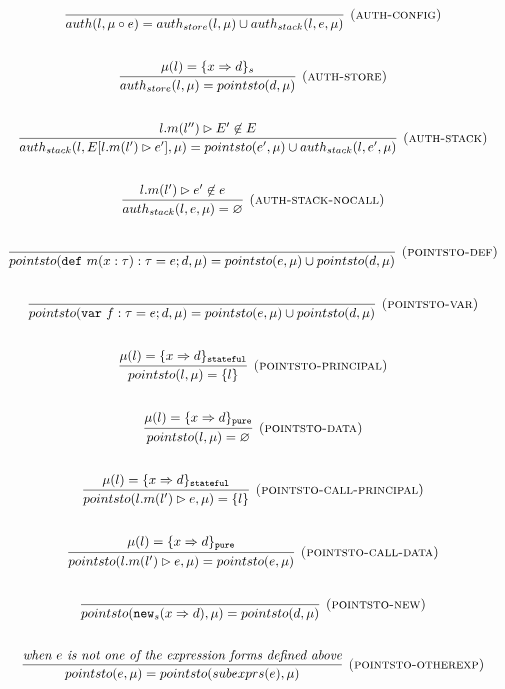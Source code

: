 \documentclass{llncs}
\newcommand{\keywadj}[1]{\mathtt{#1}}
\newcommand{\keyw}[1]{\keywadj{#1}~}
\begin{document}
\[
\begin{array}{c}
\infer[\textsc{(auth-config)}]
  {auth(l,\mu \circ e) = auth_{store}(l,\mu) \cup auth_{stack}(l,e,\mu)}
  {}\\[5ex]

\infer[\textsc{(auth-store)}]
  {auth_{store}(l,\mu) = pointsto(d,\mu)}
  {\mu(l) = \{ x \Rightarrow d \}_{s}}\\[5ex]
  
\infer[\textsc{(auth-stack)}]
  {auth_{stack}(l,E[l.m(l') \rhd e'],\mu) = pointsto(e',\mu) \cup auth_{stack}(l,e',\mu)}
  {l.m(l'') \rhd E' \not\in E}\\[5ex]
  
\infer[\textsc{(auth-stack-nocall)}]
  {auth_{stack}(l,e,\mu) = \varnothing}
  {l.m(l') \rhd e' \not\in e}\\[5ex]
  
\infer[\textsc{(pointsto-def)}]
  {pointsto(\keyw{def} m(x:\tau):\tau = e; d,\mu) = pointsto(e,\mu) \cup pointsto(d,\mu)}
  {}\\[5ex]
  
\infer[\textsc{(pointsto-var)}]
  {pointsto(\keyw{var} f:\tau = e; d,\mu) = pointsto(e,\mu) \cup pointsto(d,\mu)}
  {}\\[5ex]
  
\infer[\textsc{(pointsto-principal)}]
  {pointsto(l,\mu) = \{ l \}}
  {\mu(l) = \{ x \Rightarrow d \}_\keywadj{stateful}}\\[5ex]
  
\infer[\textsc{(pointsto-data)}]
  {pointsto(l,\mu) = \varnothing }
  {\mu(l) = \{ x \Rightarrow d \}_\keywadj{pure}}\\[5ex]

\infer[\textsc{(pointsto-call-principal)}]
  {pointsto(l.m(l') \rhd e,\mu) = \{l\} }
  {\mu(l) = \{ x \Rightarrow d \}_\keywadj{stateful}}\\[5ex]
  
\infer[\textsc{(pointsto-call-data)}]
  {pointsto(l.m(l') \rhd e,\mu) = pointsto(e,\mu)}
  {\mu(l) = \{ x \Rightarrow d \}_\keywadj{pure}}\\[5ex]
  
\infer[\textsc{(pointsto-new)}]
  {pointsto(\keywadj{new}_{s}(x \Rightarrow d),\mu) = pointsto(d,\mu) }
  {}\\[5ex]
  
\infer[\textsc{(pointsto-otherexp)}]
  {pointsto(e,\mu) = pointsto(subexprs(e),\mu) }
  {\textit{when $e$ is not one of the expression forms defined above}}\\[5ex]

\end{array}
\]
\end{document}

